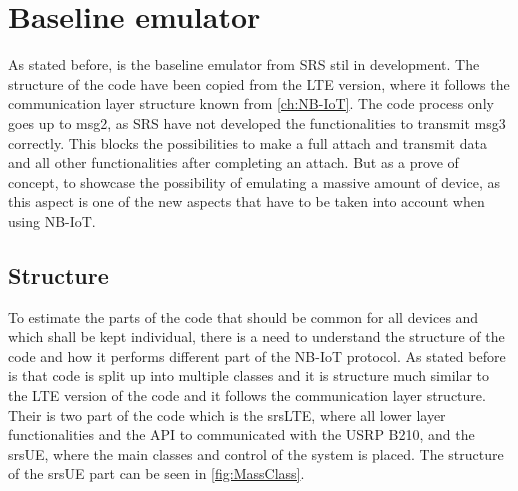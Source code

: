 


\section{Baseline emulator}
As stated before, is the baseline emulator from SRS stil in development. The structure of the code have been copied from the LTE version, where it follows the communication layer structure known from \autoref{ch:NB-IoT}. The code process only goes up to msg2, as SRS have not developed the functionalities to transmit msg3 correctly. This blocks the possibilities to make a full attach and transmit data and all other functionalities after completing an attach. But as a prove of concept, to showcase the possibility of emulating a massive amount of device, as this aspect is one of the new aspects that have to be taken into account when using NB-IoT.



\subsection{Structure}
\label{sub:MassStruct}
To estimate the parts of the code that should be common for all devices  and which shall be kept individual, there is a need to understand the structure of the code and how it performs different part of the NB-IoT protocol. As stated before is that code is split up into multiple classes and it is structure much similar to the LTE version of the code and it follows the communication layer structure. Their is two part of the code which is the srsLTE, where all lower layer functionalities and the API to communicated with the USRP B210, and the srsUE, where the main classes and control of the system is placed. The structure of the srsUE part can be seen in \autoref{fig:MassClass}. 

